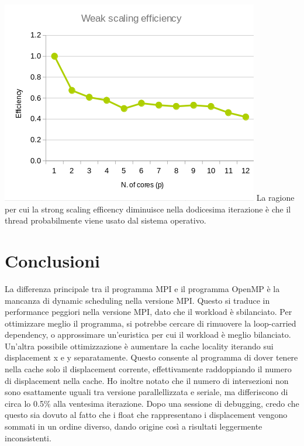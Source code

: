 \documentclass[a4paper,12pt, twoside]{report}
\begin{document}
\includegraphics[scale=0.5]{images/mpi_weak.png}
La ragione per cui la strong scaling efficency diminuisce nella dodicesima iterazione è che il thread probabilmente viene usato dal sistema operativo.
\section*{Conclusioni}
La differenza principale tra il programma MPI e il programma OpenMP è la mancanza di dynamic scheduling nella versione MPI.
Questo si traduce in performance peggiori nella versione MPI, dato che il workload è sbilanciato.
Per ottimizzare meglio il programma, si potrebbe cercare di rimuovere la loop-carried dependency, o approssimare un'euristica per cui il workload è meglio bilanciato.
Un'altra possibile ottimizzazione è aumentare la cache locality iterando sui displacement x e y separatamente.
Questo consente al programma di dover tenere nella cache solo il displacement corrente, effettivamente raddoppiando il numero di displacement nella cache.
Ho inoltre notato che il numero di intersezioni non sono esattamente uguali tra versione parallellizzata e seriale, ma differiscono di circa lo 0.5\% alla ventesima iterazione. Dopo una sessione di debugging,
credo che questo sia dovuto al fatto che i float che rappresentano i displacement vengono sommati in un ordine diverso, dando origine così a risultati leggermente inconsistenti.
\printbibliography
\appendix
\end{document}
